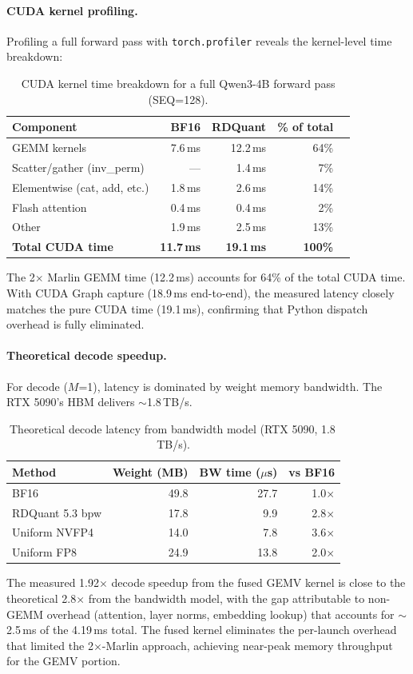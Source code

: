 \documentclass{article}
\begin{document}
\paragraph{CUDA kernel profiling.}
Profiling a full forward pass with \texttt{torch.profiler} reveals the kernel-level time breakdown:

\begin{table}[t]
\centering
\caption{CUDA kernel time breakdown for a full Qwen3-4B forward pass (SEQ=128).}
\label{tab:kernel_profile}
\begin{tabular}{lrrrr}
\toprule
\textbf{Component} & \textbf{BF16} & \textbf{RDQuant} & \textbf{\% of total} \\
\midrule
GEMM kernels & 7.6\,ms & 12.2\,ms & 64\% \\
Scatter/gather (inv\_perm) & --- & 1.4\,ms & 7\% \\
Elementwise (cat, add, etc.) & 1.8\,ms & 2.6\,ms & 14\% \\
Flash attention & 0.4\,ms & 0.4\,ms & 2\% \\
Other & 1.9\,ms & 2.5\,ms & 13\% \\
\midrule
\textbf{Total CUDA time} & \textbf{11.7\,ms} & \textbf{19.1\,ms} & \textbf{100\%} \\
\bottomrule
\end{tabular}
\end{table}

The 2$\times$ Marlin GEMM time (12.2\,ms) accounts for 64\% of the total CUDA time.
With CUDA Graph capture (18.9\,ms end-to-end), the measured latency closely matches the pure CUDA time (19.1\,ms), confirming that Python dispatch overhead is fully eliminated.

\paragraph{Theoretical decode speedup.}
For decode ($M$=1), latency is dominated by weight memory bandwidth. The RTX 5090's HBM delivers $\sim$1.8\,TB/s.
\begin{table}[t]
\centering
\caption{Theoretical decode latency from bandwidth model (RTX 5090, 1.8\,TB/s).}
\label{tab:bandwidth_model}
\begin{tabular}{lrrr}
\toprule
\textbf{Method} & \textbf{Weight (MB)} & \textbf{BW time ($\mu$s)} & \textbf{vs BF16} \\
\midrule
BF16 & 49.8 & 27.7 & 1.0$\times$ \\
RDQuant 5.3 bpw & 17.8 & 9.9 & 2.8$\times$ \\
Uniform NVFP4 & 14.0 & 7.8 & 3.6$\times$ \\
Uniform FP8 & 24.9 & 13.8 & 2.0$\times$ \\
\bottomrule
\end{tabular}
\end{table}
The measured 1.92$\times$ decode speedup from the fused GEMV kernel is close to the theoretical 2.8$\times$ from the bandwidth model, with the gap attributable to non-GEMM overhead (attention, layer norms, embedding lookup) that accounts for $\sim$2.5\,ms of the 4.19\,ms total.
The fused kernel eliminates the per-launch overhead that limited the 2$\times$-Marlin approach, achieving near-peak memory throughput for the GEMV portion.
\end{document}
